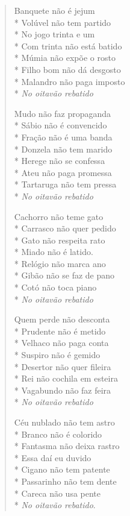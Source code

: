 \begin{verse}
Banquete não é jejum\\*
Volúvel não tem partido\\*
No jogo trinta e um\\*
Com trinta não está batido\\*
Múmia não expõe o rosto\\*
Filho bom não dá desgosto\\*
Malandro não paga imposto\\*
\textit{No oitavão rebatido}

Mudo não faz propaganda\\*
Sábio não é convencido\\*
Fração não é uma banda\\*
Donzela não tem marido\\*
Herege não se confessa\\*
Ateu não paga promessa\\*
Tartaruga não tem pressa\\*
\textit{No oitavão rebatido}

Cachorro não teme gato\\*
Carrasco não quer pedido\\*
Gato não respeita rato\\*
Miado não é latido.\\*
Relógio não marca ano\\*
Gibão não se faz de pano\\*
Cotó não toca piano\\*
\textit{No oitavão rebatido}

Quem perde não desconta\\*
Prudente não é metido\\*
Velhaco não paga conta\\*
Suspiro não é gemido\\*
Desertor não quer fileira\\*
Rei não cochila em esteira\\*
Vagabundo não faz feira\\*
\textit{No oitavão rebatido}

Céu nublado não tem astro\\*
Branco não é colorido\\*
Fantasma não deixa rastro\\*
Essa daí eu duvido\\*
Cigano não tem patente\\*
Passarinho não tem dente\\*
Careca não usa pente\\*
\textit{No oitavão rebatido}.
\end{verse}


